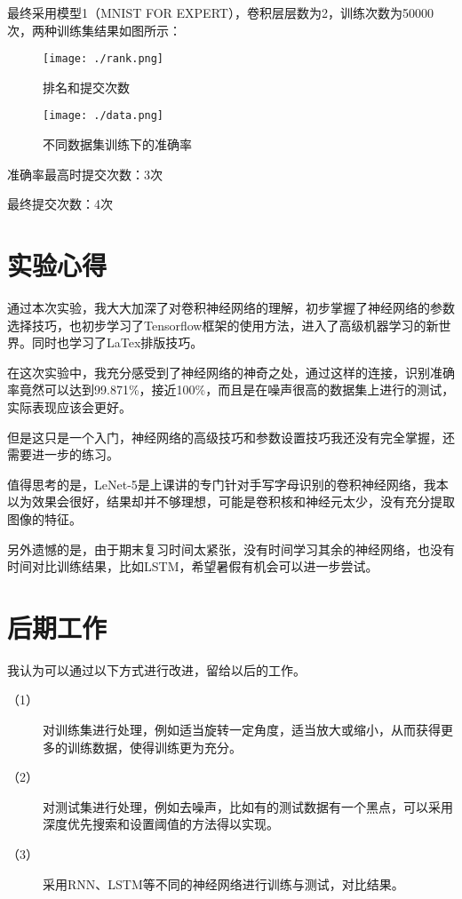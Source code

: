 \documentclass{article}
\begin{document}
最终采用模型1（MNIST FOR EXPERT），卷积层层数为2，训练次数为50000次，两种训练集结果如图所示：

 \begin{figure}[H]
  \centering\texttt{[image: ./rank.png]}
  \caption{排名和提交次数}
  \centering\texttt{[image: ./data.png]}
  \caption{不同数据集训练下的准确率}
  \end{figure}

准确率最高时提交次数：3次

最终提交次数：4次


\section{实验心得}
  通过本次实验，我大大加深了对卷积神经网络的理解，初步掌握了神经网络的参数选择技巧，也初步学习了Tensorflow框架的使用方法，进入了高级机器学习的新世界。同时也学习了LaTex排版技巧。

  在这次实验中，我充分感受到了神经网络的神奇之处，通过这样的连接，识别准确率竟然可以达到99.871\%，接近100\%，而且是在噪声很高的数据集上进行的测试，实际表现应该会更好。

  但是这只是一个入门，神经网络的高级技巧和参数设置技巧我还没有完全掌握，还需要进一步的练习。

  值得思考的是，LeNet-5是上课讲的专门针对手写字母识别的卷积神经网络，我本以为效果会很好，结果却并不够理想，可能是卷积核和神经元太少，没有充分提取图像的特征。

  另外遗憾的是，由于期末复习时间太紧张，没有时间学习其余的神经网络，也没有时间对比训练结果，比如LSTM，希望暑假有机会可以进一步尝试。

\section{后期工作}
  我认为可以通过以下方式进行改进，留给以后的工作。

  \begin{description}
    \item[（1）]对训练集进行处理，例如适当旋转一定角度，适当放大或缩小，从而获得更多的训练数据，使得训练更为充分。

    \item[（2）]对测试集进行处理，例如去噪声，比如有的测试数据有一个黑点，可以采用深度优先搜索和设置阈值的方法得以实现。

    \item[（3）]采用RNN、LSTM等不同的神经网络进行训练与测试，对比结果。
  \end{description}
\end{document}
